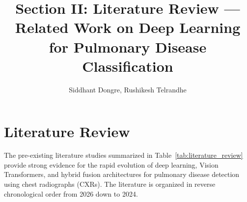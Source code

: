 \documentclass[journal]{IEEEtran}
\begin{document}
\title{Section II: Literature Review --- Related Work on Deep Learning for Pulmonary Disease Classification}
\author{Siddhant Dongre, Rushikesh Telrandhe}

\maketitle

\section{Literature Review}
\label{sec:literature_review}

The pre-existing literature studies summarized in Table~\ref{tab:literature_review} provide strong evidence for the rapid evolution of deep learning, Vision Transformers, and hybrid fusion architectures for pulmonary disease detection using chest radiographs (CXRs). The literature is organized in reverse chronological order from 2026 down to 2024.
\end{document}
